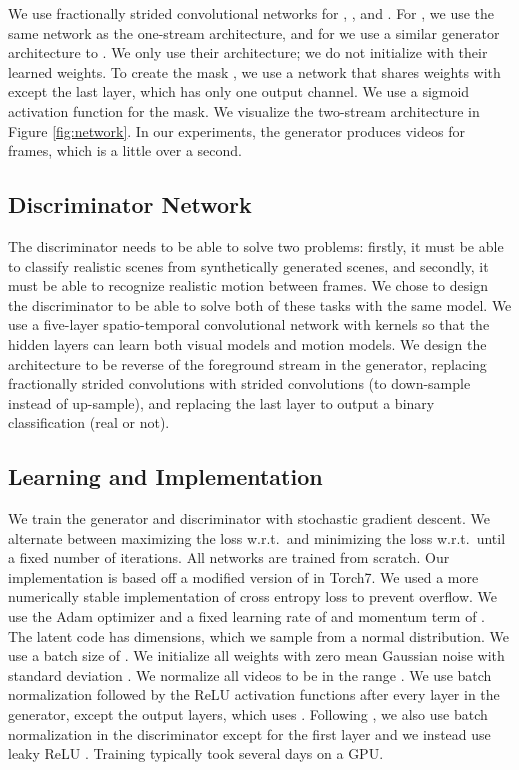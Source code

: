 \documentclass{article}
\begin{document}
We use fractionally strided convolutional networks for , , and . For , we use the same network as the one-stream architecture, and for  we use a similar generator architecture to \cite{radford2015unsupervised}. We only use their architecture; we do not initialize with their learned weights. To create the mask , we use a network that shares weights with  except the last layer, which has only one  output channel. We use a sigmoid activation function for the mask. We visualize the two-stream architecture in Figure \ref{fig:network}. In our experiments, the generator produces  videos for  frames, which is a little over a second.

\subsection{Discriminator Network}

The discriminator needs to be able to solve two problems: firstly, it must be able to classify realistic scenes from synthetically generated scenes, and secondly, it must be able to recognize realistic motion between frames. We chose to design the discriminator to be able to solve both of these tasks with the same model. We use a five-layer spatio-temporal convolutional network with kernels  so that the hidden layers can learn both visual models and motion models. We design the architecture to be reverse of the foreground stream in the generator, replacing fractionally strided convolutions with strided convolutions (to down-sample instead of up-sample), and replacing the last layer to output a binary classification (real or not). 



\subsection{Learning and Implementation}

We train the generator and discriminator with stochastic gradient descent. We alternate between maximizing the loss w.r.t.\  and minimizing the loss w.r.t.\  until a fixed number of iterations. All networks are trained from scratch.
Our implementation is based off a modified version of \cite{radford2015unsupervised} in Torch7. We used a more numerically stable implementation of cross entropy loss to prevent overflow. We use the Adam \cite{kingma2014adam} optimizer and a fixed learning rate of  and momentum term of . The latent code has  dimensions, which we sample from a normal distribution. We use a batch size of . We initialize all weights with zero mean Gaussian noise with standard deviation . We normalize all videos to be in the range . We use batch normalization \cite{ioffe2015batch} followed by the ReLU activation functions after every layer in the generator, except the output layers, which uses . Following \cite{radford2015unsupervised}, we also use batch normalization in the discriminator except for the first layer and we instead use leaky ReLU \cite{xu2015empirical}. Training typically took several days on a GPU.
\end{document}
